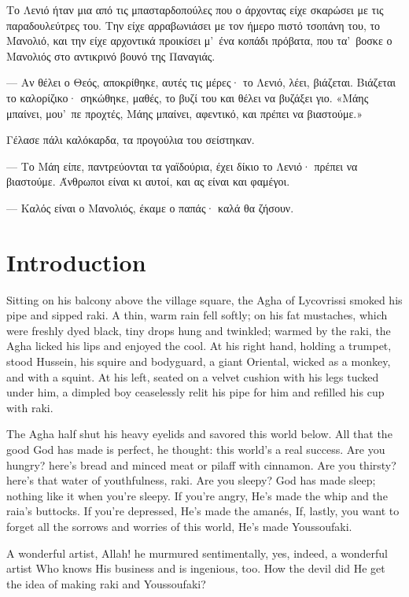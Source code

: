 \documentclass[diploma]{softlab-thesis}
\begin{document}
Το Λενιό ήταν μια από τις μπασταρδοπούλες που ο άρχοντας είχε σκαρώσει με
τις παραδουλεύτρες του. Την είχε αρραβωνιάσει με τον ήμερο πιστό τσοπάνη
του, το Μανολιό, και την είχε αρχοντικά προικίσει μ’~ένα κοπάδι πρόβατα, που
τα’~βοσκε ο Μανολιός στο αντικρινό βουνό της Παναγιάς.

--- Αν θέλει ο Θεός, αποκρίθηκε, αυτές τις μέρες· το Λενιό, λέει,
βιάζεται. Βιάζεται το καλορίζικο· σηκώθηκε, μαθές, το βυζί του και θέλει να
βυζάξει γιο. «Μάης μπαίνει, μου’~πε προχτές, Μάης μπαίνει, αφεντικό, και
πρέπει να βιαστούμε.»

Γέλασε πάλι καλόκαρδα, τα προγούλια του σείστηκαν.

--- Το Μάη είπε, παντρεύονται τα γαϊδούρια, έχει δίκιο το Λενιό· πρέπει να
βιαστούμε. Άνθρωποι είναι κι αυτοί, και ας είναι και φαμέγοι.

--- Καλός είναι ο Μανολιός, έκαμε ο παπάς· καλά θα ζήσουν.


\englishtext

\chapter{Introduction}

Sitting on his balcony above the village square, the Agha of Lycovrissi
smoked his pipe and sipped raki. A thin, warm rain fell softly; on his fat
mustaches, which were freshly dyed black, tiny drops hung and twinkled;
warmed by the raki, the Agha licked his lips and enjoyed the cool. At his
right hand, holding a trumpet, stood Hussein, his squire and bodyguard, a
giant Oriental, wicked as a monkey, and with a squint. At his left, seated
on a velvet cushion with his legs tucked under him, a dimpled boy
ceaselessly relit his pipe for him and refilled his cup with raki.

The Agha half shut his heavy eyelids and savored this world below. All that
the good God has made is perfect, he thought: this world’s a real
success. Are you hungry? here’s bread and minced meat or pilaff with
cinnamon. Are you thirsty? here’s that water of youthfulness, raki. Are you
sleepy? God has made sleep; nothing like it when you’re sleepy. If you’re
angry, He’s made the whip and the raia’s buttocks. If you’re depressed, He’s
made the amanés, If, lastly, you want to forget all the sorrows and worries
of this world, He’s made Youssoufaki.

A wonderful artist, Allah! he murmured sentimentally, yes, indeed, a
wonderful artist Who knows His business and is ingenious, too. How the devil
did He get the idea of making raki and Youssoufaki?
\end{document}
